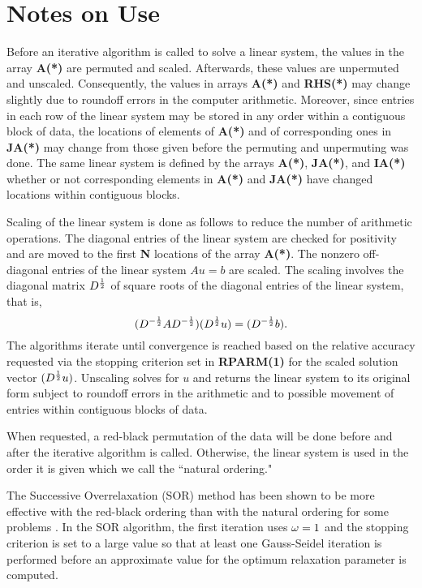 \section{Notes on Use}
\label{notes}
 
Before an iterative algorithm is called to solve a linear system, the
values in the array {\bf A(*)} are permuted and scaled.  Afterwards, these
values are unpermuted and unscaled.  Consequently, the values in arrays
{\bf A(*)} and {\bf RHS(*)} may change slightly due to roundoff errors 
in the computer arithmetic.  Moreover, since entries in each row of the 
linear system may be stored in any order within a contiguous block of 
data, the locations of elements of {\bf A(*)} and of corresponding ones 
in {\bf JA(*)} may change from those given before the permuting and 
unpermuting was done.  The same linear system is defined by the arrays 
{\bf A(*)}, {\bf JA(*)}, and {\bf IA(*)} whether or not corresponding 
elements in {\bf A(*)} and {\bf JA(*)} have changed locations within 
contiguous blocks.
 
Scaling of the linear system is done as follows to reduce the number
of arithmetic operations.  The diagonal entries of the linear system are
checked for positivity and are moved to the first {\bf N} locations of the
array {\bf A(*)}.  The nonzero off-diagonal entries of the linear system 
$Au=b$ are scaled.  The scaling involves the diagonal matrix $D^{\frac{1}{2}}$ of 
square roots of the diagonal entries of the linear system, that is,
\[  (D^{-\frac{1}{2}}AD^{-\frac{1}{2}})(D^{\frac{1}{2}}u) = (D^{-\frac{1}{2}}b). \]
The algorithms iterate until convergence is reached based on the
relative accuracy requested via the stopping criterion set in {\bf RPARM(1)}
for the scaled solution vector $(D^{\frac{1}{2}}u)$.  Unscaling solves for $u$ and
returns the linear system to its original form subject to roundoff
errors in the arithmetic and to possible movement of entries within
contiguous blocks of data.
 
When requested, a red-black permutation of the data will be done
before and after the iterative algorithm is called.  Otherwise, the
linear system is used in the order it is given which we call the
``natural ordering."
 
The Successive Overrelaxation (SOR) method has been shown to be more
effective with the red-black ordering than with the natural ordering for
some problems \cite{18}.  In the SOR algorithm, the first iteration uses
$\omega = 1$ and the stopping criterion is set to a large value so 
that at least one Gauss-Seidel iteration is performed before an 
approximate value for the optimum relaxation parameter is computed.
 
